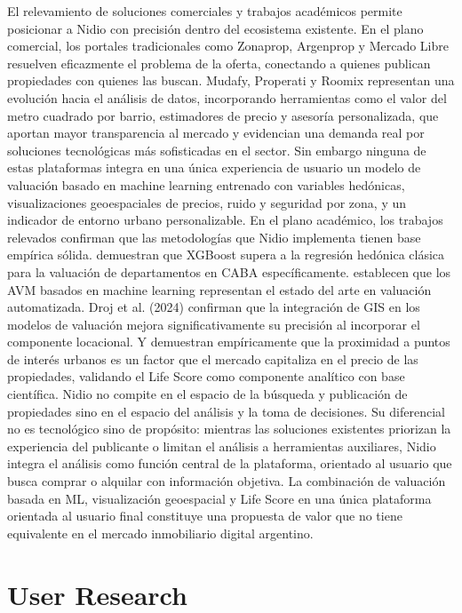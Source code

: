 El relevamiento de soluciones comerciales y trabajos académicos permite posicionar a Nidio con precisión dentro del ecosistema existente. En el plano comercial, los portales tradicionales como Zonaprop, Argenprop y Mercado Libre resuelven eficazmente el problema de la oferta, conectando a quienes publican propiedades con quienes las buscan. Mudafy, Properati y Roomix representan una evolución hacia el análisis de datos, incorporando herramientas como el valor del metro cuadrado por barrio, estimadores de precio y asesoría personalizada, que aportan mayor transparencia al mercado y evidencian una demanda real por soluciones tecnológicas más sofisticadas en el sector. Sin embargo ninguna de estas plataformas integra en una única experiencia de usuario un modelo de valuación basado en machine learning entrenado con variables hedónicas, visualizaciones geoespaciales de precios, ruido y seguridad por zona, y un indicador de entorno urbano personalizable. En el plano académico, los trabajos relevados confirman que las metodologías que Nidio implementa tienen base empírica sólida. \textcite{GutierrezEtAl2025} demuestran que XGBoost supera a la regresión hedónica clásica para la valuación de departamentos en CABA específicamente. \textcite{ElJaouhariEtAl2024} establecen que los AVM basados en machine learning representan el estado del arte en valuación automatizada. Droj et al. (2024) confirman que la integración de GIS en los modelos de valuación mejora significativamente su precisión al incorporar el componente locacional. Y \textcite{PivoFisher2011} demuestran empíricamente que la proximidad a puntos de interés urbanos es un factor que el mercado capitaliza en el precio de las propiedades, validando el Life Score como componente analítico con base científica. Nidio no compite en el espacio de la búsqueda y publicación de propiedades sino en el espacio del análisis y la toma de decisiones. Su diferencial no es tecnológico sino de propósito: mientras las soluciones existentes priorizan la experiencia del publicante o limitan el análisis a herramientas auxiliares, Nidio integra el análisis como función central de la plataforma, orientado al usuario que busca comprar o alquilar con información objetiva. La combinación de valuación basada en ML, visualización geoespacial y Life Score en una única plataforma orientada al usuario final constituye una propuesta de valor que no tiene equivalente en el mercado inmobiliario digital argentino.

\section{User Research}

